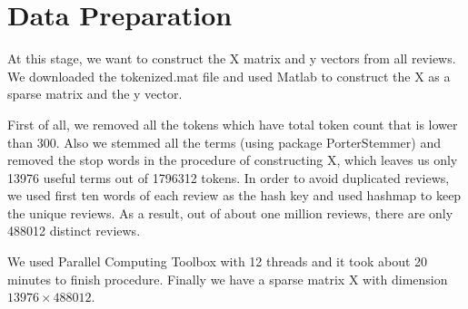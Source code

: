 \documentclass[paper=a4, fontsize=11pt]{scrartcl} %
\numberwithin{equation}{section} %
\numberwithin{figure}{section} %
\numberwithin{table}{section} %
\begin{document}
\section{Data Preparation}
At this stage, we want to construct the X matrix and y vectors from all reviews. We downloaded the tokenized.mat file and used Matlab to construct the X as a sparse matrix and the y vector. 

First of all, we removed all the tokens which have total token count that is lower than 300. Also we stemmed all the terms (using package PorterStemmer) and removed the stop words in the procedure of constructing X, which leaves us only 13976 useful terms out of 1796312 tokens. In order to avoid duplicated reviews, we used first ten words of each review as the hash key and used hashmap to keep the unique reviews. As a result, out of about one million reviews, there are only 488012 distinct reviews.


We used Parallel Computing Toolbox with 12 threads and it took about 20 minutes to finish procedure.  Finally we have a sparse matrix X with dimension $13976 \times 488012$. 
\end{document}
